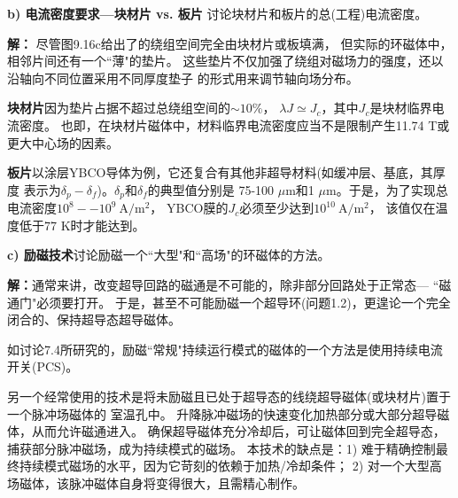 \textbf{b) 电流密度要求---块材片 vs. 板片}\qquad
讨论块材片和板片的总(工程)电流密度。

\textbf{解：} 尽管图9.16c给出了的绕组空间完全由块材片或板填满，
但实际的环磁体中，相邻片间还有一个``薄"的垫片。
这些垫片不仅加强了绕组对磁场力的强度，还以沿轴向不同位置采用不同厚度垫子
的形式用来调节轴向场分布。

\textbf{块材片}\qquad 因为垫片占据不超过总绕组空间的$\sim 10\%$，
$\lambda J\simeq J_c$，其中$J_c$是块材临界电流密度。
也即，在块材片磁体中，材料临界电流密度应当不是限制产生11.74 T或更大中心场的因素。

\textbf{板片}\qquad 以涂层YBCO导体为例，它还复合有其他非超导材料(如缓冲层、基底，其厚度
表示为$\delta_p-\delta_f$)。$\delta_p$和$\delta_f$的典型值分别是
75-100 $\mu$m和1 $\mu$m。于是，为了实现总电流密度$10^8--10^9\ \mathrm{ A/m^2}$，
YBCO膜的$J_c$必须至少达到$10^{10}\ \mathrm{ A/m^2}$，
该值仅在温度低于77 K时才能达到。

\textbf{c) 励磁技术}\qquad 讨论励磁一个``大型"和``高场"的环磁体的方法。

\textbf{解：}通常来讲，改变超导回路的磁通是不可能的，除非部分回路处于正常态---
``磁通门"必须要打开。
于是，甚至不可能励磁一个超导环(问题1.2)，更遑论一个完全闭合的、保持超导态超导磁体。

如讨论7.4所研究的，励磁``常规"持续运行模式的磁体的一个方法是使用持续电流开关(PCS)。

另一个经常使用的技术是将未励磁且已处于超导态的线绕超导磁体(或块材片)置于一个脉冲场磁体的
室温孔中。
升降脉冲磁场的快速变化加热部分或大部分超导磁体，从而允许磁通进入。
确保超导磁体充分冷却后，可让磁体回到完全超导态，捕获部分脉冲磁场，成为持续模式的磁场。
本技术的缺点是：1) 难于精确控制最终持续模式磁场的水平，因为它苛刻的依赖于加热/冷却条件；
2) 对一个大型高场磁体，该脉冲磁体自身将变得很大，且需精心制作。


